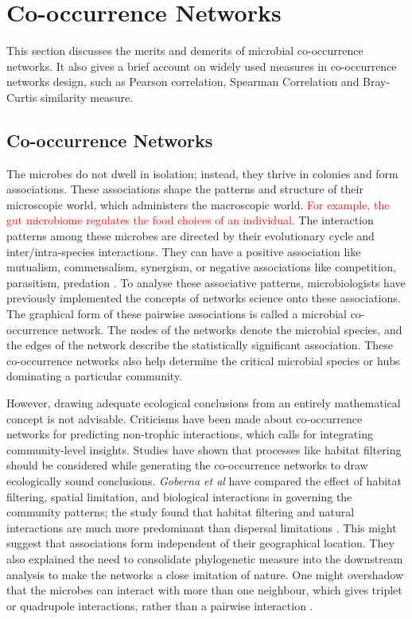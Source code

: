 \chapter{Co-occurrence Networks}
 \setcounter{page}{18}

This section discusses the merits and demerits of microbial co-occurrence networks. It also gives a brief account on widely used measures in co-occurrence networks design, such as Pearson correlation, Spearman Correlation and Bray-Curtis similarity measure.

\section{Co-occurrence Networks}
The microbes do not dwell in isolation; instead, they thrive in colonies and form associations. These associations shape the patterns and structure of their microscopic world, which administers the macroscopic world. \textcolor{red}{For example, the gut microbiome regulates the food choices of an individual.} The interaction patterns among these microbes are directed by their evolutionary cycle and inter/intra-species interactions. They can have a positive association like mutualism, commensalism, synergism, or negative associations like competition, parasitism, predation \cite{weiss_2016_correlation}. To analyse these associative patterns, microbiologists have previously implemented the concepts of networks science onto these associations. The graphical form of these pairwise associations is called a microbial co-occurrence network. The nodes of the networks denote the microbial species, and the edges of the network describe the statistically significant association. These co-occurrence networks also help determine the critical microbial species or hubs dominating a particular community.\newline

However, drawing adequate ecological conclusions from an entirely mathematical concept is not advisable. Criticisms have been made about co-occurrence networks for predicting non-trophic interactions, which calls for integrating community-level insights. Studies have shown that processes like habitat filtering should be considered while generating the co-occurrence networks to draw ecologically sound conclusions. \emph{Goberna et al} have compared the effect of habitat filtering, spatial limitation, and biological interactions in governing the community patterns; the study found that habitat filtering and natural interactions are much more predominant than dispersal limitations \cite{ref10}. This might suggest that associations form independent of their geographical location. They also explained the need to consolidate phylogenetic measure into the downstream analysis to make the networks a close imitation of nature. One might overshadow that the microbes can interact with more than one neighbour, which gives triplet or quadrupole interactions, rather than a pairwise interaction \cite{berry_2014_deciphering}.

